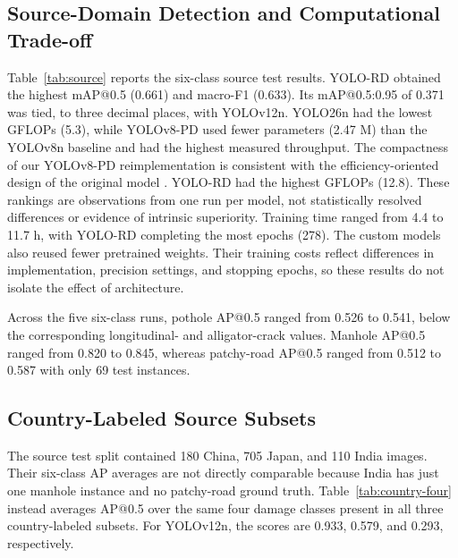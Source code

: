 \documentclass[conference]{IEEEtran}
\newif\ifcountryanalysis   \countryanalysistrue  %
\begin{document}
\subsection{Source-Domain Detection and Computational Trade-off}
Table~\ref{tab:source} reports the six-class source test results. YOLO-RD obtained the highest mAP@0.5 (0.661) and macro-F1 (0.633). Its mAP@0.5:0.95 of 0.371 was tied, to three decimal places, with YOLOv12n. YOLO26n had the lowest GFLOPs (5.3), while YOLOv8-PD used fewer parameters (2.47 M) than the YOLOv8n baseline and had the highest measured throughput. The compactness of our YOLOv8-PD reimplementation is consistent with the efficiency-oriented design of the original model \cite{Zeng2024}. YOLO-RD had the highest GFLOPs (12.8). These rankings are observations from one run per model, not statistically resolved differences or evidence of intrinsic superiority. Training time ranged from 4.4 to 11.7 h, with YOLO-RD completing the most epochs (278). The custom models also reused fewer pretrained weights. Their training costs reflect differences in implementation, precision settings, and stopping epochs, so these results do not isolate the effect of architecture.

Across the five six-class runs, pothole AP@0.5 ranged from 0.526 to 0.541, below the corresponding longitudinal- and alligator-crack values. Manhole AP@0.5 ranged from 0.820 to 0.845, whereas patchy-road AP@0.5 ranged from 0.512 to 0.587 with only 69 test instances.

\ifcountryanalysis
\subsection{Country-Labeled Source Subsets}

The source test split contained 180 China, 705 Japan, and 110 India images. Their six-class AP averages are not directly comparable because India has just one manhole instance and no patchy-road ground truth. Table~\ref{tab:country-four} instead averages AP@0.5 over the same four damage classes present in all three country-labeled subsets. For YOLOv12n, the scores are 0.933, 0.579, and 0.293, respectively.
\end{document}

